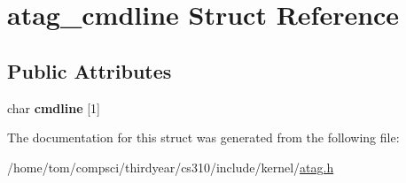 \hypertarget{structatag__cmdline}{}\section{atag\+\_\+cmdline Struct Reference}
\label{structatag__cmdline}
\subsection*{Public Attributes}
\begin{DoxyCompactItemize}
\item 
\mbox{\label{structatag__cmdline_aaf9ad41bcdf280b93ada143996c581fe}} 
char {\bfseries cmdline} \mbox{[}1\mbox{]}
\end{DoxyCompactItemize}


The documentation for this struct was generated from the following file\+:\begin{DoxyCompactItemize}
\item 
/home/tom/compsci/thirdyear/cs310/include/kernel/\mbox{\hyperlink{atag_8h}{atag.\+h}}\end{DoxyCompactItemize}
